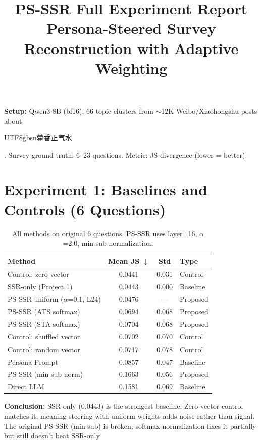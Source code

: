 \documentclass[10pt,a4paper]{article}
\title{\vspace{-2cm}\textbf{PS-SSR Full Experiment Report}\\\large Persona-Steered Survey Reconstruction with Adaptive Weighting}
\date{}
\author{}
\begin{document}
\maketitle
\vspace{-1.5cm}

\textbf{Setup:} Qwen3-8B (bf16), 66 topic clusters from $\sim$12K Weibo/Xiaohongshu posts about \begin{CJK}{UTF8}{gbsn}藿香正气水\end{CJK}. Survey ground truth: 6--23 questions. Metric: JS divergence (lower = better).

\section{Experiment 1: Baselines and Controls (6 Questions)}

\begin{table}[h]
\centering\small
\caption{All methods on original 6 questions. PS-SSR uses layer=16, $\alpha$=2.0, min-sub normalization.}
\begin{tabular}{@{}lccl@{}}
\toprule
Method & Mean JS $\downarrow$ & Std & Type \\
\midrule
Control: zero vector & 0.0441 & 0.031 & Control \\
\rowcolor{best} SSR-only (Project 1) & 0.0443 & 0.000 & Baseline \\
PS-SSR uniform ($\alpha$=0.1, L24) & 0.0476 & --- & Proposed \\
PS-SSR (ATS softmax) & 0.0694 & 0.068 & Proposed \\
PS-SSR (STA softmax) & 0.0704 & 0.068 & Proposed \\
Control: shuffled vector & 0.0702 & 0.070 & Control \\
Control: random vector & 0.0717 & 0.078 & Control \\
Persona Prompt & 0.0857 & 0.047 & Baseline \\
PS-SSR (min-sub norm) & 0.1663 & 0.056 & Proposed \\
Direct LLM & 0.1581 & 0.069 & Baseline \\
\bottomrule
\end{tabular}
\end{table}

\textbf{Conclusion:} SSR-only (0.0443) is the strongest baseline. Zero-vector control matches it, meaning steering with uniform weights adds noise rather than signal. The original PS-SSR (min-sub) is broken; softmax normalization fixes it partially but still doesn't beat SSR-only.
\end{document}
